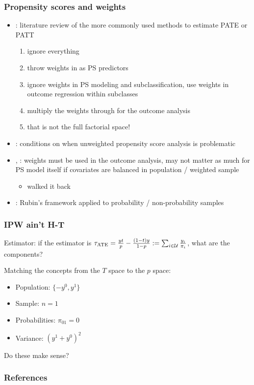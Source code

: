 \documentclass{beamer}
\begin{document}
\begin{frame}\frametitle{Propensity scores and weights}

\begin{itemize}
	\item \citet{dong:stuart:lenis:nguyen:2020}: 
	      literature review of the more commonly used methods to estimate PATE or PATT
			\begin{enumerate}
				\item ignore everything
				\item throw weights in as PS predictors
			   \item ignore weights in PS modeling and subclassification, 
			          use weights in outcome regression within subclasses
			   \item multiply the weights through for the outcome analysis
			   \item that is not the full factorial space! 
			\end{enumerate}
	\item \citet{ridgeway:kovalchik:griffin:kabeto:2015}: 
	      conditions on when unweighted propensity score analysis is problematic
	\item \citet{lenis:nguyen:dong:stuart:2017},
			\citet{austin:jembere:chiu:2018}: weights must be used in the outcome analysis,
			may not matter as much for PS model itself if covariates are balanced in population
			/ weighted sample 
			\begin{itemize}
					\item \citet{dong:stuart:lenis:nguyen:2020} walked it back
			\end{itemize}
	\item \citet{mercer:kreuter:keeter:stuart:2017}: 
			Rubin's framework applied to probability / non-probability samples
\end{itemize}
\end{frame}

\begin{frame}\frametitle{IPW ain't H-T}

Estimator: if the estimator is $\tau_{\rm ATE}=\frac{yt}{p}-\frac{(1-t)y}{1-p} := \sum_{i \in \mathcal{U}} \frac{y_i}{\pi_i}$, 
what are the components?

Matching the concepts from the $T$ space to the $p$ space:

\begin{itemize}
    \item Population: $\{-y^0, y^1\}$
    \item Sample: $n=1$
    \item Probabilities: $\pi_{01}=0$
    \item Variance: $(y^1+y^0)^2$
\end{itemize}

Do these make sense? 

\end{frame}

\begin{frame}[allowframebreaks]\frametitle{References}




\end{frame}
\end{document}
